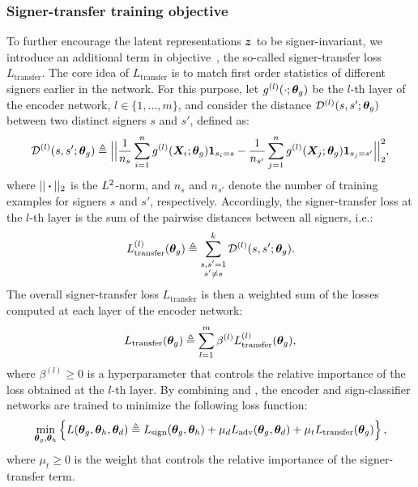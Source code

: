 \subsubsection{Signer-transfer training objective}
To further encourage the latent representations ${\bm{z}}$ to be signer-invariant, we introduce an additional term in objective~, the so-called signer-transfer loss $L_{\text{transfer}}$. The core idea of $L_{\text{transfer}}$ is to match first order statistics of different signers earlier in the network. For this purpose, let $g^{(l)}(\cdot;{\bm{\theta}}_g)$ be the $l$-th layer of the encoder network, $l \in \{1,...,m\}$, and consider the distance ${\mathcal{D}}^{(l)}(s, s'; {\bm{\theta}}_g)$ between two distinct signers $s$ and $s'$, defined as:
\begin{equation}
\label{eq:sign_transfer_pairwise_loss}
{\mathcal{D}}^{(l)}(s, s'; {\bm{\theta}}_g) \triangleq \Big|\Big| \frac{1}{n_s} \sum_{i=1}^n g^{(l)}({\bm{X}}_{i}; {\bm{\theta}}_g) \bm{1}_{s_i = s} - \frac{1}{n_{s'}}\sum_{j=1}^n g^{(l)}({\bm{X}}_{j}; {\bm{\theta}}_g) \bm{1}_{s_j = s'} \Big|\Big|_2^2,
\end{equation}
where $||\boldsymbol{\cdot}||_2$ is the $L^2$-norm, and $n_s$ and $n_{s'}$ denote the number of training examples for signers $s$ and $s'$, respectively. Accordingly, the signer-transfer loss at the $l$-th layer is the sum of the pairwise distances between all signers, i.e.:
\begin{equation}
L_{\text{transfer}}^{(l)}({\bm{\theta}}_g) \triangleq \sum_{\substack{s,s'=1 \\ s' \neq s}}^k {\mathcal{D}}^{(l)}(s,s'; {\bm{\theta}}_g).
\end{equation}
The overall signer-transfer loss $L_{\text{transfer}}$ is then a weighted sum of the losses computed at each layer of the encoder network:
\begin{equation}
\label{eq:signer_transfer_loss}
L_{\text{transfer}}({\bm{\theta}}_g) \triangleq \sum_{l=1}^{m} \beta^{(l)} L_{\text{transfer}}^{(l)}({\bm{\theta}}_g),
\end{equation}
where $\beta^{(l)}\geq 0$ is a hyperparameter that controls the relative importance of the loss obtained at the $l$-th layer.
By combining  and , the encoder and sign-classifier networks are trained to minimize the following loss function:
\begin{equation}
\label{eq:enc_sign_loss}
\min_{{\bm{\theta}}_g, {\bm{\theta}}_h} \left\lbrace L({\bm{\theta}}_g, {\bm{\theta}}_h, {\bm{\theta}}_d) \triangleq L_{\text{sign}}({\bm{\theta}}_g, {\bm{\theta}}_h) + \mu_d L_{\text{adv}}({\bm{\theta}}_g, {\bm{\theta}}_d) +
\mu_t L_{\text{transfer}}({\bm{\theta}}_g) \right\rbrace,
\end{equation}
where $\mu_t \geq 0$ is the weight that controls the relative importance of the signer-transfer term.

